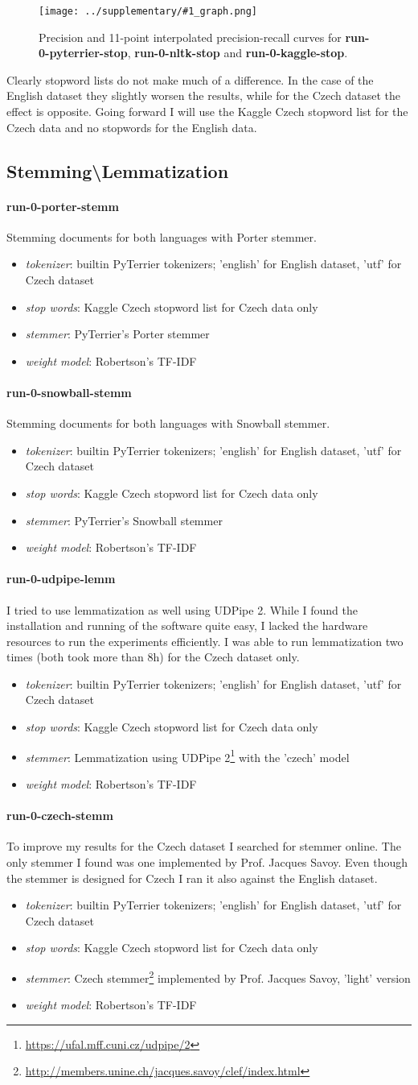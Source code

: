 \documentclass[10pt]{article}
\newcommand{\RunName}[1]{\textbf{#1}}
\newcommand{\Run}[6]{
\begin{samepage}
    \paragraph{\RunName{#1}} #6

    \begin{itemize}
        \item \emph{tokenizer}: #2
        \item \emph{stop words}: #3
        \item \emph{stemmer}: #4
        \item \emph{weight model}: #5
    \end{itemize}
\end{samepage}
}
\newcommand{\RunResults}[2]{%
\begin{table}[h]
\centering

    \caption{Results of #2.\label{tbl:#1}}
\end{table}

\begin{figure}[h]
\centering
\texttt{[image: ../supplementary/\#1\_graph.png]}
    \caption{Precision and 11-point interpolated precision-recall curves for
    #2.\label{fig:#1}}
\end{figure}
}
\begin{document}
\RunResults{stopwords}{\RunName{run-0-pyterrier-stop}, \RunName{run-0-nltk-stop}
and \RunName{run-0-kaggle-stop}}

Clearly stopword lists do not make much of a difference. In the case of the
English dataset they slightly worsen the results, while for the Czech dataset
the effect is opposite. Going forward I will use the Kaggle Czech stopword list
for the Czech data and no stopwords for the English data.

\subsection{Stemming{\textbackslash}Lemmatization}

\Run{run-0-porter-stemm}{
    builtin PyTerrier tokenizers; 'english' for English dataset, 'utf' for Czech dataset
}{
    Kaggle Czech stopword list for Czech data only
}{
    PyTerrier's Porter stemmer
}{Robertson's TF-IDF}{Stemming documents for both languages with Porter stemmer.}

\Run{run-0-snowball-stemm}{
    builtin PyTerrier tokenizers; 'english' for English dataset, 'utf' for Czech dataset
}{
    Kaggle Czech stopword list for Czech data only
}{
    PyTerrier's Snowball stemmer
}{Robertson's TF-IDF}{Stemming documents for both languages with Snowball stemmer.}

\Run{run-0-udpipe-lemm}{
    builtin PyTerrier tokenizers; 'english' for English dataset, 'utf' for Czech dataset
}{
    Kaggle Czech stopword list for Czech data only
}{
    Lemmatization using UDPipe
    2\footnote{\url{https://ufal.mff.cuni.cz/udpipe/2}} with the 'czech' model
}{Robertson's TF-IDF}{
    I tried to use lemmatization as well using UDPipe 2. While I found the
installation and running of the software quite easy, I lacked the hardware
resources to run the experiments efficiently. I was able to run lemmatization
two times (both took more than 8h) for the Czech dataset only.
}

\Run{run-0-czech-stemm}{
    builtin PyTerrier tokenizers; 'english' for English dataset, 'utf' for Czech dataset
}{
    Kaggle Czech stopword list for Czech data only
}{
    Czech 
    stemmer\footnote{\url{http://members.unine.ch/jacques.savoy/clef/index.html}}
    implemented by Prof. Jacques Savoy, 'light' version
}{Robertson's TF-IDF}{
    To improve my results for the Czech dataset I searched for stemmer online. The
only stemmer I found was one implemented by Prof. Jacques Savoy. Even though the
stemmer is designed for Czech I ran it also against the English dataset.
}
\end{document}
